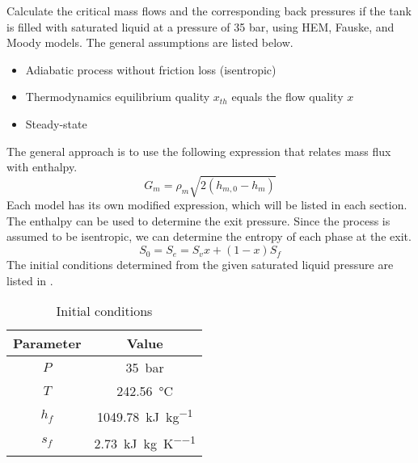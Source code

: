\documentclass[12pt]{article}
\begin{document}
Calculate the critical mass flows and the corresponding back pressures if the tank is filled with saturated liquid at a pressure of 35 bar, using HEM, Fauske, and Moody models. The general assumptions are listed below.
\begin{itemize}
    \item Adiabatic process without friction loss (isentropic)
    \item Thermodynamics equilibrium quality $x_{th}$ equals the flow quality $x$
    \item Steady-state
\end{itemize}
% 
The general approach is to use the following expression that relates mass flux with enthalpy.
\begin{equation}
    G_m = \rho_m \sqrt{2 \left( h_{m,0} - h_m \right)}
\end{equation}
Each model has its own modified expression, which will be listed in each section. The enthalpy can be used to determine the exit pressure. Since the process is assumed to be isentropic, we can determine the entropy of each phase at the exit.
\begin{equation}
    S_0 = S_e = S_v x + \left( 1-x \right) S_f
\end{equation}
The initial conditions determined from the given saturated liquid pressure are listed in .

\begin{table}[htbp]
    \centering
    \caption{Initial conditions}
    \begin{tabular}{cc}
        \toprule
        Parameter & Value\\
        \midrule
        $P$ & \SI{35}{bar}\\
        $T$ & \SI{242.56}{\celsius}\\
        $h_f$ & \SI{1049.78}{\kilo\joule\per\kilo\gram}\\
        $s_f$ & \SI{2.73}{\kilo\joule\per\kilo\gram\per\kelvin}\\
        \bottomrule
    \end{tabular}
    \label{tab:init}
\end{table}
\end{document}
